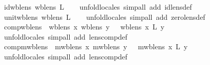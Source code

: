 \begin{isabellebody}
\isamarkuptrue%
\isamarkupfalse%
\ id{\isacharunderscore}wb{\isacharunderscore}lens{\isacharcolon}\ {\isachardoublequoteopen}wb{\isacharunderscore}lens\ {}\isactrlsub L{\isachardoublequoteclose}\isanewline
%
\isadelimproof
\ \ %
\endisadelimproof
%
\isatagproof
{}\isamarkupfalse%
\ {\isacharparenleft}unfold{\isacharunderscore}locales{\isacharcomma}\ simp{\isacharunderscore}all\ add{\isacharcolon}\ id{\isacharunderscore}lens{\isacharunderscore}def{\isacharparenright}%
\endisatagproof
{\isafoldproof}%
%
\isadelimproof
\isanewline
%
\endisadelimproof
\isanewline
{}\isamarkupfalse%
\ unit{\isacharunderscore}wb{\isacharunderscore}lens{\isacharcolon}\ {\isachardoublequoteopen}wb{\isacharunderscore}lens\ {}\isactrlsub L{\isachardoublequoteclose}\isanewline
%
\isadelimproof
\ \ %
\endisadelimproof
%
\isatagproof
{}\isamarkupfalse%
\ {\isacharparenleft}unfold{\isacharunderscore}locales{\isacharcomma}\ simp{\isacharunderscore}all\ add{\isacharcolon}\ zero{\isacharunderscore}lens{\isacharunderscore}def{\isacharparenright}%
\endisatagproof
{\isafoldproof}%
%
\isadelimproof
\isanewline
%
\endisadelimproof
\isanewline
{}\isamarkupfalse%
\ comp{\isacharunderscore}wb{\isacharunderscore}lens{\isacharcolon}\ {\isachardoublequoteopen}{\isasymlbrakk}\ wb{\isacharunderscore}lens\ x{\isacharsemicolon}\ wb{\isacharunderscore}lens\ y\ {\isasymrbrakk}\ {\isasymLongrightarrow}\ wb{\isacharunderscore}lens\ {\isacharparenleft}x\ {\isacharsemicolon}\isactrlsub L\ y{\isacharparenright}{\isachardoublequoteclose}\isanewline
%
\isadelimproof
\ \ %
\endisadelimproof
%
\isatagproof
{}\isamarkupfalse%
\ {\isacharparenleft}unfold{\isacharunderscore}locales{\isacharcomma}\ simp{\isacharunderscore}all\ add{\isacharcolon}\ lens{\isacharunderscore}comp{\isacharunderscore}def{\isacharparenright}%
\endisatagproof
{\isafoldproof}%
%
\isadelimproof
\isanewline
%
\endisadelimproof
\isanewline
{}\isamarkupfalse%
\ comp{\isacharunderscore}mwb{\isacharunderscore}lens{\isacharcolon}\ {\isachardoublequoteopen}{\isasymlbrakk}\ mwb{\isacharunderscore}lens\ x{\isacharsemicolon}\ mwb{\isacharunderscore}lens\ y\ {\isasymrbrakk}\ {\isasymLongrightarrow}\ mwb{\isacharunderscore}lens\ {\isacharparenleft}x\ {\isacharsemicolon}\isactrlsub L\ y{\isacharparenright}{\isachardoublequoteclose}\isanewline
%
\isadelimproof
\ \ %
\endisadelimproof
%
\isatagproof
{}\isamarkupfalse%
\ {\isacharparenleft}unfold{\isacharunderscore}locales{\isacharcomma}\ simp{\isacharunderscore}all\ add{\isacharcolon}\ lens{\isacharunderscore}comp{\isacharunderscore}def{\isacharparenright}%

\end{isabellebody}
